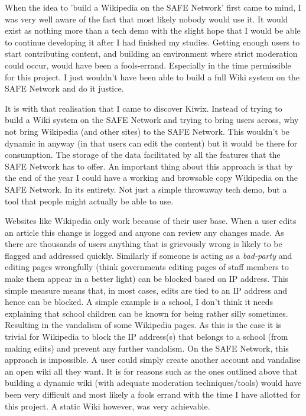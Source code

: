 When the idea to 'build a Wikipedia on the SAFE Network' first came to mind, I was very well aware of the fact that most likely nobody would use it. It would exist as nothing more than a tech demo with the slight hope that I would be able to continue developing it after I had finished my studies. Getting enough users to start contributing content, and building an environment where strict moderation could occur, would have been a fools-errand. Especially in the time permissible for this project. I just wouldn't have been able to build a full Wiki system on the SAFE Network and do it justice.

It is with that realisation that I came to discover Kiwix. Instead of trying to build a Wiki system on the SAFE Network and trying to bring users across, why not bring Wikipedia (and other sites) to the SAFE Network. This wouldn't be dynamic in anyway (in that users can edit the content) but it would be there for consumption. The storage of the data facilitated by all the features that the SAFE Network has to offer. An important thing about this approach is that by the end of the year I could have a working and browsable copy Wikipedia on the SAFE Network. In its entirety. Not just a simple throwaway tech demo, but a tool that people might actually be able to use.

Websites like Wikipedia only work because of their user base. When a user edits an article this change is logged and anyone can review any changes made. As there are thousands of users anything that is grievously wrong is likely to be flagged and addressed quickly. Similarly if someone is acting as a \textit{bad-party} and editing pages wrongfully (think governments editing pages of staff members to make them appear in a better light) can be blocked based on IP address. This simple measure means that, in most cases, edits are tied to an IP address and hence can be blocked. A simple example is a school, I don't think it needs explaining that school children can be known for being rather silly sometimes. Resulting in the vandalism of some Wikipedia pages. As this is the case it is trivial for Wikipedia to block the IP address(s) that belongs to a school (from making edits) and prevent any further vandalism. On the SAFE Network, this approach is impossible. A user could simply create another account and vandalise an open wiki all they want. It is for reasons such as the ones outlined above that building a dynamic wiki (with adequate moderation techniques/tools) would have been very difficult and most likely a fools errand with the time I have allotted for this project. A static Wiki however, was very achievable.

